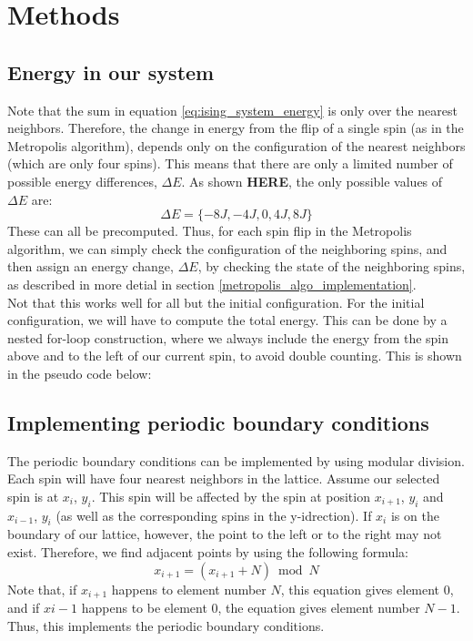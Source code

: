 \documentclass[a4paper, 10pt]{article}
\begin{document}
\section{Methods}
\subsection{Energy in our system}\label{energy_in_system}
Note that the sum in equation \ref{eq:ising_system_energy} is only over the nearest neighbors. Therefore, the change in energy from the flip of a single spin (as in the Metropolis algorithm), depends only on the configuration of the nearest neighbors (which are only four spins). This means that there are only a limited number of possible energy differences, $\Delta E$. As shown \textbf{HERE}, the only possible values of $\Delta E$ are:
$$\Delta E = \{ -8J, -4J, 0, 4J, 8J\}$$
These can all be precomputed. Thus, for each spin flip in the Metropolis algorithm, we can simply check the configuration of the neighboring spins, and then assign an energy change, $\Delta E$, by checking the state of the neighboring spins, as described in more detial in section \ref{metropolis_algo_implementation}.\\
\linebreak
Not that this works well for all but the initial configuration. For the initial configuration, we will have to compute the total energy. This can be done by a nested for-loop construction, where we always include the energy from the spin above and to the left of our current spin, to avoid double counting. This is shown in the pseudo code below:

\subsection{Implementing periodic boundary conditions}
The periodic boundary conditions can be implemented by using modular division. Each spin will have four nearest neighbors in the lattice. Assume our selected spin is at $x_i$, $y_i$. This spin will be affected by the spin at position $x_{i+1}$, $y_i$ and $x_{i-1}$, $y_i$ (as well as the corresponding spins in the y-idrection). If $x_i$ is on the boundary of our lattice, however, the point to the left or to the right may not exist. Therefore, we find adjacent points by using the following formula:
\begin{equation}\label{eq:modular_arithmetic}
x_{i+1}=(x_{i+1}+N) \bmod N
\end{equation}
Note that, if $x_{i+1}$ happens to element number $N$, this equation gives element 0, and if $x{i-1}$ happens to be element 0, the equation gives element number $N-1$. Thus, this implements the periodic boundary conditions.
\end{document}
